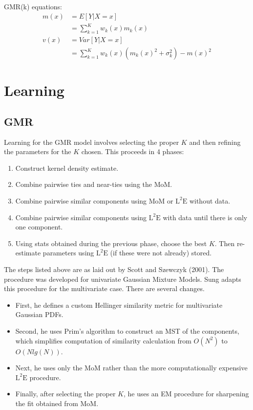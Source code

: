 \documentclass[10pt]{proc}
\begin{document}
GMR(k) equations:
%
\begin{align}
    \nonumber
    m(x) &= E[Y|X = x] \\
         &= \sum_{k=1}^K w_k(x) m_k(x) \\
    \nonumber
    v(x) &= Var[Y|X = x] \\
         &= \sum_{k=1}^K w_k(x) (m_k(x)^2 + \sigma_k^2) - m(x)^2
\end{align}

\section{Learning}\label{learning}

\subsection{GMR}

Learning for the GMR model involves selecting the proper $K$ and then refining
the parameters for the $K$ chosen. This proceeds in 4 phases:
%
\begin{enumerate}
    \item  Construct kernel density estimate.
    \item  Combine pairwise ties and near-ties using the MoM.
    \item  Combine pairwise similar components using MoM or $\text{L}^2\text{E}$
        without data.
    \item  Combine pairwise similar components using $\text{L}^2\text{E}$ with
        data until there is only one component.
    \item  Using stats obtained during the previous phase, choose the best $K$.
        Then re-estimate parameters using $\text{L}^2\text{E}$ (if these were not
        already) stored.
\end{enumerate}

The steps listed above are as laid out by Scott and Szewczyk (2001). The
procedure was developed for univariate Gaussian Mixture Models. Sung adapts this
procedure for the multivariate case. There are several changes.
%
\begin{itemize}
    \item  First, he defines a custom Hellinger similarity metric for
        multivariate Gaussian PDFs.
    \item  Second, he uses Prim's algorithm to construct an MST of the
        components, which simplifies computation of similarity calculation from
        $O(N^2)$ to $O(Nlg(N))$.
    \item  Next, he uses only the MoM rather than the more computationally
        expensive $\text{L}^2\text{E}$ procedure.
    \item  Finally, after selecting the proper $K$, he uses an EM procedure for
        sharpening the fit obtained from MoM.
\end{itemize}
\end{document}

